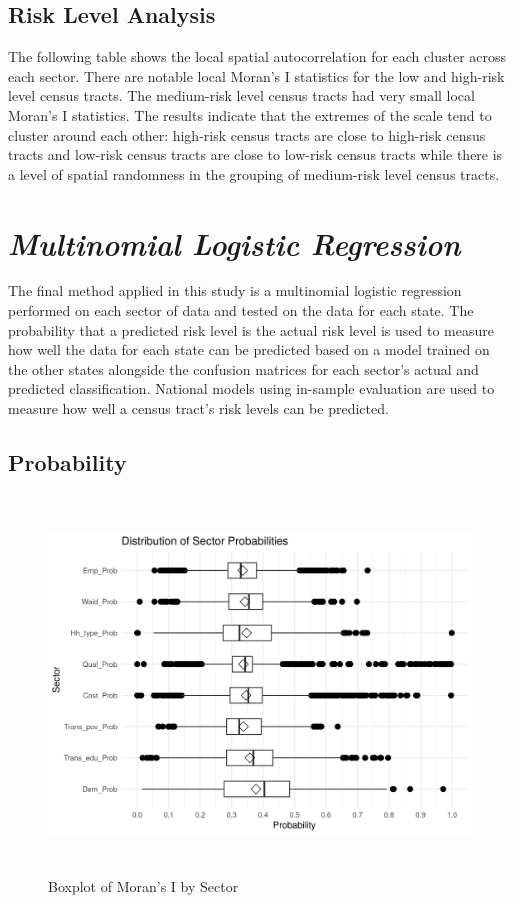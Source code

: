 \subsection{Risk Level Analysis}

The following table shows the local spatial autocorrelation for each cluster across each sector. There are notable local Moran's I statistics for the low and high-risk level census tracts. The medium-risk level census tracts had very small local Moran's I statistics. The results indicate that the extremes of the scale tend to cluster around each other: high-risk census tracts are close to high-risk census tracts and low-risk census tracts are close to low-risk census tracts while there is a level of spatial randomness in the grouping of medium-risk level census tracts. 



\section{\textit{Multinomial Logistic Regression}}

The final method applied in this study is a multinomial logistic regression performed on each sector of data and tested on the data for each state. The probability that a predicted risk level is the actual risk level is used to measure how well the data for each state can be predicted based on a model trained on the other states alongside the confusion matrices for each sector's actual and predicted classification. National models using in-sample evaluation are used to measure how well a census tract's risk levels can be predicted.

\subsection{Probability}

\begin{figure}[htbp]
    \centering
     \includegraphics[width=1\textwidth, height=10cm]{plots/prob_sector.png}
     \caption{Boxplot of Moran's I by Sector}
     \label{fig:prob_sector}
 \end{figure}

